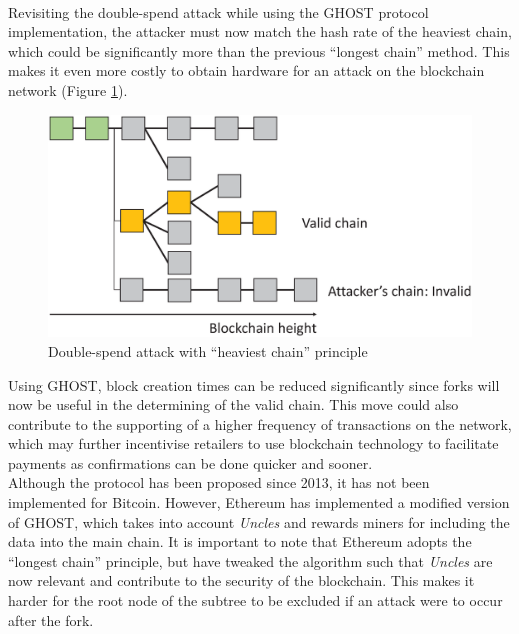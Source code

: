 \documentclass[a4paper,12pt]{article}
\begin{document}
{{\begin{algorithm}
\begin{algorithmic}[1]
				\Else
				\EndIf
			\EndFor
	\end{algorithmic}
\end{algorithm}\\
Revisiting the double-spend attack while using the \ac{GHOST} protocol implementation, the attacker must now match the hash rate of the heaviest chain, which could be significantly more than the previous ``longest chain'' method. This makes it even more costly to obtain hardware for an attack on the blockchain network (Figure \ref{fig:ghost2spendheavy}).
\begin{figure}[H]
	\centering
	\includegraphics[width=0.7\linewidth]{ghost2spendheavy}
	\caption{Double-spend attack with ``heaviest chain'' principle}
	\label{fig:ghost2spendheavy}
\end{figure}
\noindent Using \ac{GHOST}, block creation times can be reduced significantly since forks will now be useful in the determining of the valid chain. This move could also contribute to the supporting of a higher frequency of transactions on the network, which may further incentivise retailers to use blockchain technology to facilitate payments as confirmations can be done quicker and sooner.\\\newline
Although the protocol has been proposed since 2013, it has not been implemented for Bitcoin. However, Ethereum has implemented a modified version of \ac{GHOST}, which takes into account \textit{Uncles} and rewards miners for including the data into the main chain. It is important to note that Ethereum adopts the ``longest chain'' principle, but have tweaked the algorithm such that \textit{Uncles} are now relevant and contribute to the security of the blockchain. This makes it harder for the root node of the subtree to be excluded if an attack were to occur after the fork.
}}
\end{document}
